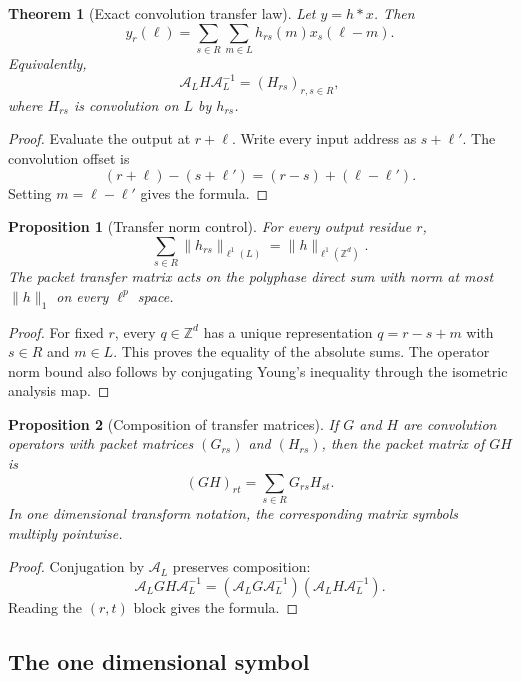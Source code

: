 \documentclass[11pt,letterpaper]{article}
\newtheorem{theorem}{Theorem}[section]
\theoremstyle{plain}
\newtheorem{proposition}[proposition]{Proposition}
\theoremstyle{plain}
\theoremstyle{plain}
\theoremstyle{definition}
\theoremstyle{definition}
\theoremstyle{definition}
\theoremstyle{definition}
\theoremstyle{remark}
\theoremstyle{remark}
\theoremstyle{remark}
\theoremstyle{remark}
\newcommand{\ZZ}{\mathbb Z}
\newcommand{\Acal}{\mathcal A}
\begin{document}
\begin{theorem}[Exact convolution transfer law]\label{thm:convolution_transfer}
Let \(y=h*x\). Then
\[
y_r(\ell)
=
\sum_{s\in R}\sum_{m\in L}h_{rs}(m)x_s(\ell-m).
\]
Equivalently,
\[
\Acal_LH\Acal_L^{-1}
=
(H_{rs})_{r,s\in R},
\]
where \(H_{rs}\) is convolution on \(L\) by \(h_{rs}\).
\end{theorem}

\begin{proof}
Evaluate the output at \(r+\ell\). Write every input address as \(s+\ell'\). The convolution offset is
\[
(r+\ell)-(s+\ell')
=(r-s)+(\ell-\ell').
\]
Setting \(m=\ell-\ell'\) gives the formula.
\end{proof}

\begin{proposition}[Transfer norm control]\label{prop:transfer_norm_control}
For every output residue \(r\),
\[
\sum_{s\in R}\|h_{rs}\|_{\ell^1(L)}
=
\|h\|_{\ell^1(\ZZ^d)}.
\]
The packet transfer matrix acts on the polyphase direct sum with norm at most \(\|h\|_1\) on every \(\ell^p\) space.
\end{proposition}

\begin{proof}
For fixed \(r\), every \(q\in\ZZ^d\) has a unique representation \(q=r-s+m\) with \(s\in R\) and \(m\in L\). This proves the equality of the absolute sums. The operator norm bound also follows by conjugating Young's inequality through the isometric analysis map.
\end{proof}

\begin{proposition}[Composition of transfer matrices]\label{prop:transfer_composition}
If \(G\) and \(H\) are convolution operators with packet matrices \((G_{rs})\) and \((H_{rs})\), then the packet matrix of \(GH\) is
\[
(GH)_{rt}
=
\sum_{s\in R}G_{rs}H_{st}.
\]
In one dimensional transform notation, the corresponding matrix symbols multiply pointwise.
\end{proposition}

\begin{proof}
Conjugation by \(\Acal_L\) preserves composition:
\[
\Acal_LGH\Acal_L^{-1}
=
(\Acal_LG\Acal_L^{-1})(\Acal_LH\Acal_L^{-1}).
\]
Reading the \((r,t)\) block gives the formula.
\end{proof}

\subsection{The one dimensional symbol}
\end{document}
